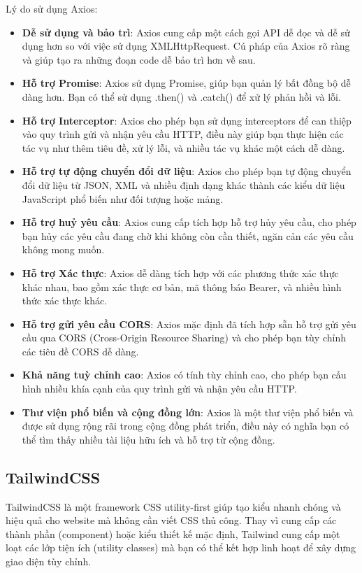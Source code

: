 Lý do sử dụng Axios:
\begin{itemize}
    \item \textbf{Dễ sử dụng và bảo trì}: Axios cung cấp một cách gọi API dễ đọc và dễ sử dụng hơn so với việc sử dụng XMLHttpRequest. Cú pháp của Axios rõ ràng và giúp tạo ra những đoạn code dễ bảo trì hơn về sau.
    \item \textbf{Hỗ trợ Promise}: Axios sử dụng Promise, giúp bạn quản lý bất đồng bộ dễ dàng hơn. Bạn có thể sử dụng .then() và .catch() để xử lý phản hồi và lỗi.
    \item \textbf{Hỗ trợ Interceptor}: Axios cho phép bạn sử dụng interceptors để can thiệp vào quy trình gửi và nhận yêu cầu HTTP, điều này giúp bạn thực hiện các tác vụ như thêm tiêu đề, xử lý lỗi, và nhiều tác vụ khác một cách dễ dàng.
    \item \textbf{Hỗ trợ tự động chuyển đổi dữ liệu}: Axios cho phép bạn tự động chuyển đổi dữ liệu từ JSON, XML và nhiều định dạng khác thành các kiểu dữ liệu JavaScript phổ biến như đối tượng hoặc mảng.
    \item \textbf{Hỗ trợ huỷ yêu cầu}: Axios cung cấp tích hợp hỗ trợ hủy yêu cầu, cho phép bạn hủy các yêu cầu đang chờ khi không còn cần thiết, ngăn cản các yêu cầu không mong muốn.
    \item \textbf{Hỗ trợ Xác thực}: Axios dễ dàng tích hợp với các phương thức xác thực khác nhau, bao gồm xác thực cơ bản, mã thông báo Bearer, và nhiều hình thức xác thực khác.
    \item \textbf{Hỗ trợ gửi yêu cầu CORS}: Axios mặc định đã tích hợp sẵn hỗ trợ gửi yêu cầu qua CORS (Cross-Origin Resource Sharing) và cho phép bạn tùy chỉnh các tiêu đề CORS dễ dàng.
    \item \textbf{Khả năng tuỳ chỉnh cao}: Axios có tính tùy chỉnh cao, cho phép bạn cấu hình nhiều khía cạnh của quy trình gửi và nhận yêu cầu HTTP.
    \item \textbf{Thư viện phổ biến và cộng đồng lớn}: Axios là một thư viện phổ biến và được sử dụng rộng rãi trong cộng đồng phát triển, điều này có nghĩa bạn có thể tìm thấy nhiều tài liệu hữu ích và hỗ trợ từ cộng đồng.
\end{itemize}

\subsection{TailwindCSS}
TailwindCSS là một framework CSS utility-first giúp tạo kiểu nhanh chóng và hiệu quả cho website mà không cần viết CSS thủ công. Thay vì cung cấp các thành phần (component) hoặc kiểu thiết kế mặc định, Tailwind cung cấp một loạt các lớp tiện ích (utility classes) mà bạn có thể kết hợp linh hoạt để xây dựng giao diện tùy chỉnh.

